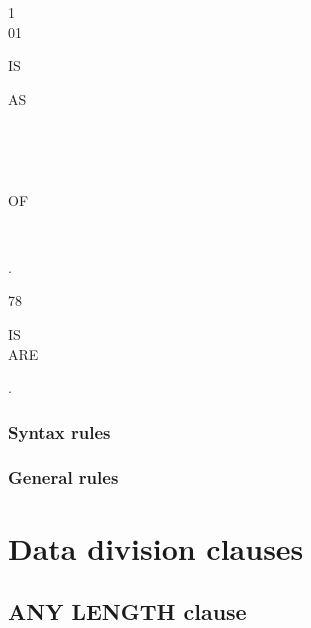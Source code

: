 \begin{syntax}
  \begin{1=}
    1 \\
    01
  \end{1=}
  \identifier {}
  \begin{0-1}
    IS 
  \end{0-1}
  \begin{1=}
    AS
    \begin{1=}
      \literal \\
      \begin{1=}
         \\
      \end{1=}
      OF \identifier
    \end{1=} \\
  \end{1=}.
\end{syntax}

\begin{syntax}[\miscextcolour]
  78 \identifier
  \begin{0-1}
    IS \\
    ARE
  \end{0-1}
  \literal .
\end{syntax}

\subsubsection{Syntax rules}

\subsubsection{General rules}

\section{Data division clauses}

\subsection{ANY LENGTH clause}

\begin{syntax}
  \begin{1=}
     \\
     \\
  \end{1=}
\end{syntax}

